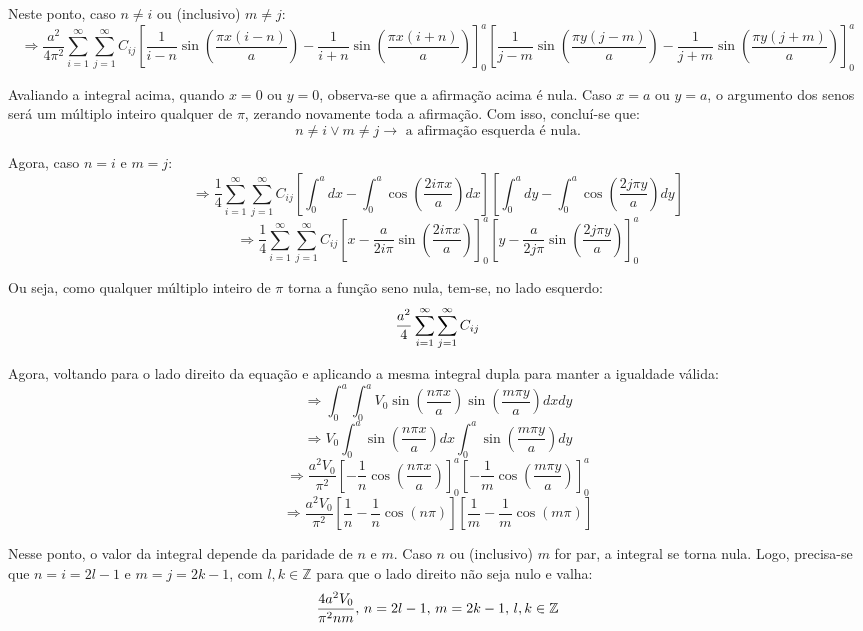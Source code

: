 \documentclass{report}
\begin{document}
Neste ponto, caso $ n \neq i $ ou (inclusivo) $ m \neq j $:
$$ \scriptstyle \Rightarrow \frac{a^2}{4\pi^2} \sum_{i=1}^{\infty} \sum_{j=1}^{\infty} C_{ij} \left[\frac{1}{i - n}\sin\left(\frac{\pi x(i - n)}{a}\right) - \frac{1}{i + n}\sin\left(\frac{\pi x(i + n)}{a}\right)\right]_{0}^{a} \left[\frac{1}{j - m}\sin\left(\frac{\pi y(j - m)}{a}\right) - \frac{1}{j + m}\sin\left(\frac{\pi y(j + m)}{a}\right)\right]_{0}^{a} $$

Avaliando a integral acima, quando $ x = 0 $ ou $ y = 0 $, observa-se que a afirmação acima é nula. Caso $ x = a $ ou $ y = a $, o argumento dos senos será um múltiplo inteiro qualquer de $ \pi $, zerando novamente toda a afirmação. Com isso, concluí-se que:
$$ n \neq i \lor m \neq j \rightarrow \text{ a afirmação esquerda é nula.} $$

Agora, caso $ n = i $ e $ m = j $:
$$ \Rightarrow \frac{1}{4} \sum_{i=1}^{\infty} \sum_{j=1}^{\infty} C_{ij} \left[\int_{0}^{a}dx - \int_{0}^{a}\cos\left(\frac{2i\pi x}{a}\right)dx\right]\left[\int_{0}^{a}dy - \int_{0}^{a}\cos\left(\frac{2j\pi y}{a}\right)dy\right] $$
$$ \Rightarrow \frac{1}{4} \sum_{i=1}^{\infty} \sum_{j=1}^{\infty} C_{ij} \left[x - \frac{a}{2i\pi}\sin\left(\frac{2i\pi x}{a}\right)\right]_{0}^{a}\left[y - \frac{a}{2j\pi}\sin\left(\frac{2j\pi y}{a}\right)\right]_{0}^{a} $$

Ou seja, como qualquer múltiplo inteiro de $ \pi $ torna a função seno nula, tem-se, no lado esquerdo:
\begin{equation}
  \label{eq:Cij_left}
  \centering
  \frac{a^2}{4} \sum_{i=1}^{\infty} \sum_{j=1}^{\infty} C_{ij}
\end{equation}

Agora, voltando para o lado direito da equação e aplicando a mesma integral dupla para manter a igualdade válida:
$$ \Rightarrow \int_{0}^{a} \int_{0}^{a} V_0\sin\left(\frac{n\pi x}{a}\right)\sin\left(\frac{m\pi y}{a}\right)dxdy $$
$$ \Rightarrow V_0 \int_{0}^{a} \sin\left(\frac{n\pi x}{a}\right)dx \int_{0}^{a} \sin\left(\frac{m\pi y}{a}\right)dy $$
$$ \Rightarrow \frac{a^2V_0}{\pi^2} \left[-\frac{1}{n}\cos\left(\frac{n\pi x}{a}\right)\right]_{0}^{a} \left[-\frac{1}{m}\cos\left(\frac{m\pi y}{a}\right)\right]_{0}^{a} $$
$$ \Rightarrow \frac{a^2V_0}{\pi^2} \left[\frac{1}{n} - \frac{1}{n}\cos\left(n\pi\right)\right] \left[\frac{1}{m} - \frac{1}{m}\cos\left(m\pi\right)\right] $$

Nesse ponto, o valor da integral depende da paridade de $ n $ e $ m $. Caso $ n $ ou (inclusivo) $ m $ for par, a integral se torna nula. Logo, precisa-se que $ n = i = 2l - 1 $ e $ m = j = 2k - 1 $, com $ l, k \in \mathbb{Z} $ para que o lado
direito não seja nulo e valha:
\begin{equation}
  \label{eq:Cij_right}
  \centering
  \frac{4a^2V_0}{\pi^2 nm},\, n = 2l - 1,\, m = 2k - 1,\, l, k \in \mathbb{Z}
\end{equation}
\end{document}
